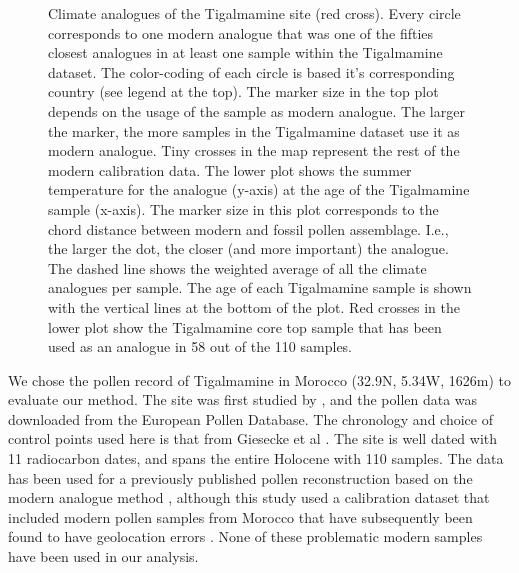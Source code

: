 \begin{refsection}
\begin{figure}
	\caption[Climate analogues of the Tigalmamine site]{Climate analogues of the Tigalmamine site (red cross). Every circle corresponds to one modern analogue that was one of the fifties closest analogues in at least one sample within the Tigalmamine dataset. The color-coding of each circle is based it's corresponding country (see legend at the top). The marker size in the top plot depends on the usage of the sample as modern analogue. The larger the marker, the more samples in the Tigalmamine dataset use it as modern analogue. Tiny crosses in the map represent the rest of the modern calibration data. The lower plot shows the summer temperature for the analogue (y-axis) at the age of the Tigalmamine sample (x-axis). The marker size in this plot corresponds to the chord distance between modern and fossil pollen assemblage. I.e., the larger the dot, the closer (and more important) the analogue. The dashed line shows the weighted average of all the climate analogues per sample. The age of each Tigalmamine sample is shown with the vertical lines at the bottom of the plot. Red crosses in the lower plot show the Tigalmamine core top sample that has been used as an analogue in 58 out of the 110 samples.}
	\label{fig:gridding-site-analogues}
\end{figure}

We chose the pollen record of Tigalmamine in Morocco (32.9N, 5.34W, 1626m) to evaluate our method. The site was first studied by \cite{LambKaars1995}, and the pollen data was downloaded from the European Pollen Database. The chronology and choice of control points used here is that from Giesecke et al \citep{GieseckeDavisBrewerEtAl2013}. The site is well dated with 11 radiocarbon dates, and spans the entire Holocene with 110 samples. The data has been used for a previously published pollen reconstruction based on the modern analogue method \citep{CheddadiLambGuiotEtAl1998}, although this study used a calibration dataset that included modern pollen samples from Morocco that have subsequently been found to have geolocation errors \citep{DavisZanonCollinsEtAl2013}. None of these problematic modern samples have been used in our analysis. 


\end{refsection}
